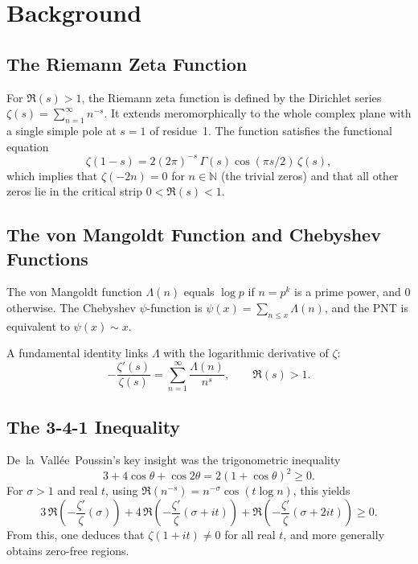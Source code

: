 \documentclass[11pt,a4paper]{article}
\theoremstyle{remark}
\begin{document}
\section{Background}

\subsection{The Riemann Zeta Function}

For $\Re(s)>1$, the Riemann zeta function is defined by the Dirichlet series
$\zeta(s)=\sum_{n=1}^{\infty} n^{-s}$. It extends meromorphically to the
whole complex plane with a single simple pole at $s=1$ of residue~1. The
function satisfies the functional equation
\[
\zeta(1-s) = 2(2\pi)^{-s}\,\Gamma(s)\cos(\pi s/2)\,\zeta(s),
\]
which implies that $\zeta(-2n)=0$ for $n\in\mathbb{N}$ (the trivial zeros)
and that all other zeros lie in the critical strip $0<\Re(s)<1$.

\subsection{The von Mangoldt Function and Chebyshev Functions}

The von Mangoldt function $\Lambda(n)$ equals $\log p$ if $n=p^k$ is a prime
power, and $0$ otherwise. The Chebyshev $\psi$-function is
$\psi(x)=\sum_{n\leq x}\Lambda(n)$, and the PNT is equivalent to
$\psi(x)\sim x$.

A fundamental identity links $\Lambda$ with the logarithmic derivative of
$\zeta$:
\[
-\frac{\zeta'(s)}{\zeta(s)} = \sum_{n=1}^{\infty} \frac{\Lambda(n)}{n^{s}},
\qquad \Re(s)>1.
\]

\subsection{The 3-4-1 Inequality}

De~la~Vall\'ee~Poussin's key insight was the trigonometric inequality
\[
3 + 4\cos\theta + \cos 2\theta = 2(1+\cos\theta)^{2} \geq 0.
\]
For $\sigma>1$ and real $t$, using $\Re(n^{-s}) = n^{-\sigma}\cos(t\log n)$,
this yields
\[
3\,\Re\!\left(-\frac{\zeta'}{\zeta}(\sigma)\right)
+ 4\,\Re\!\left(-\frac{\zeta'}{\zeta}(\sigma+it)\right)
+ \Re\!\left(-\frac{\zeta'}{\zeta}(\sigma+2it)\right) \geq 0.
\]
From this, one deduces that $\zeta(1+it)\neq 0$ for all real $t$, and more
generally obtains zero-free regions.
\end{document}
